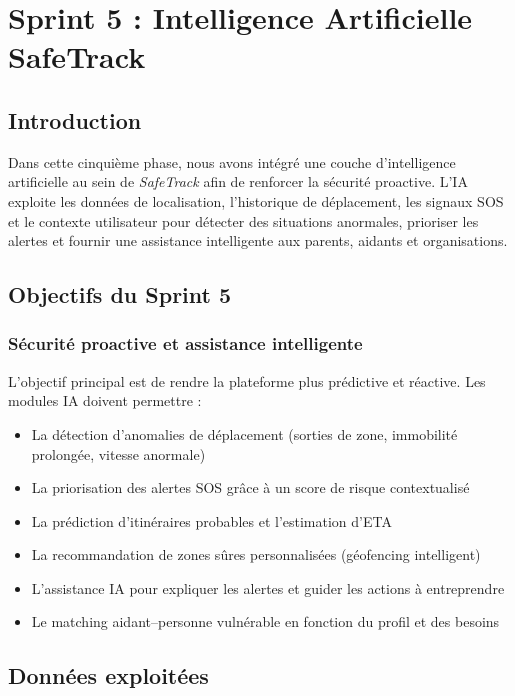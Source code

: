 \chapter{Sprint 5 : Intelligence Artificielle SafeTrack}

\DeclareRobustCommand{\greencheck}{%
  \tikz\fill[scale=0.4, color=green]
  (0,.35) -- (.25,0) -- (1,.7) -- (.25,.15) -- cycle;%
}

\minitoc
\section*{Introduction}
Dans cette cinquième phase, nous avons intégré une couche d'intelligence artificielle au sein de \textit{SafeTrack} afin de renforcer la sécurité proactive. L'IA exploite les données de localisation, l'historique de déplacement, les signaux SOS et le contexte utilisateur pour détecter des situations anormales, prioriser les alertes et fournir une assistance intelligente aux parents, aidants et organisations.

\section{Objectifs du Sprint 5}

\subsection{Sécurité proactive et assistance intelligente}
L'objectif principal est de rendre la plateforme plus prédictive et réactive. Les modules IA doivent permettre :
\begin{itemize}
    \item La détection d'anomalies de déplacement (sorties de zone, immobilité prolongée, vitesse anormale)
    \item La priorisation des alertes SOS grâce à un score de risque contextualisé
    \item La prédiction d'itinéraires probables et l'estimation d'ETA
    \item La recommandation de zones sûres personnalisées (géofencing intelligent)
    \item L'assistance IA pour expliquer les alertes et guider les actions à entreprendre
    \item Le matching aidant--personne vulnérable en fonction du profil et des besoins
\end{itemize}

\section{Données exploitées}

